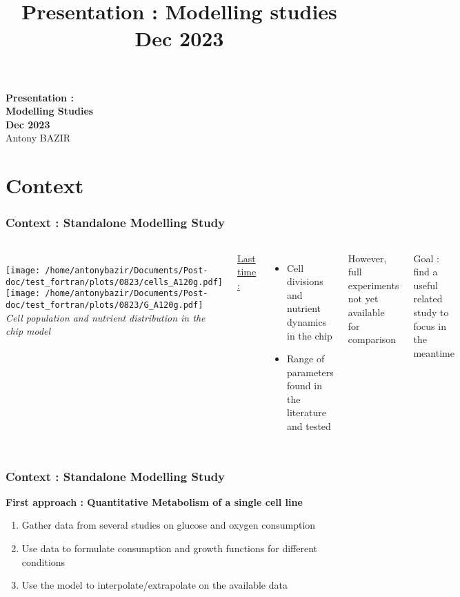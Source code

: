 \documentclass{beamer}
\title[Modelling Dec 2023]{Presentation : Modelling studies Dec 2023}
\author[Antony Bazir]{}
\begin{document}
\begin{frame}
\centering 
\textbf{Presentation : \\ Modelling Studies \\  Dec 2023}\\
\vspace{0.5 cm}
Antony BAZIR
\end{frame}

\section{Context}
\begin{frame}
\frametitle{Context : Standalone Modelling Study}
\begin{columns} 
		\column{50mm}
			\vspace{0cm}\\
				\texttt{[image: /home/antonybazir/Documents/Post-doc/test\_fortran/plots/0823/cells\_A120g.pdf]}\\
				\vspace{0.1cm}
				\texttt{[image: /home/antonybazir/Documents/Post-doc/test\_fortran/plots/0823/G\_A120g.pdf]}\\
			\textit{\tiny Cell population and nutrient distribution in the chip model}
			 
		
		\column{50mm}
		\underline{Last time :}
			\begin{itemize}
				\item Cell divisions and nutrient dynamics in the chip
				\item Range of parameters found in the literature and tested
			\end{itemize}
			However, full experiments not yet available for comparison
			
				\begin{block}{}
					Goal : find a useful related study to focus in the meantime
				\end{block}
			
	\end{columns} 
	
\end{frame}

\begin{frame}
	\frametitle{Context : Standalone Modelling Study}
	
	\textbf{First approach : Quantitative Metabolism of a single cell line
	}
	
	\vspace{2cm}
	
	\begin{enumerate}
		\item Gather data from several studies on glucose and oxygen consumption
		\item Use data to formulate consumption and growth functions for different conditions 
		\item Use the model to interpolate/extrapolate on the available data  
	\end{enumerate}
	
	\vspace{1cm} 
	
\end{frame}
\end{document}
